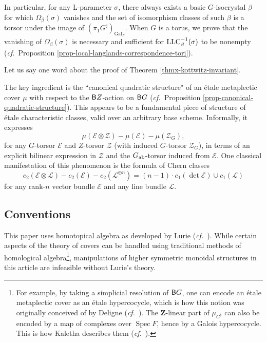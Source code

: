 \documentclass[10pt,english,reqno]{amsart}
\newcommand{\integers}{\mathbf Z}
\newcommand{\Gal}{\operatorname{Gal}}
\newcommand{\deloop}{\textnormal{\textsf{B}}}
\newcommand{\Spec}{\operatorname{Spec}}
\newcommand{\abelian}{\textnormal{ab}}
\newcommand{\LLC}{\textnormal{LLC}}
\theoremstyle{definition}
\numberwithin{equation}{section}
\begin{document}

In particular, for any L-parameter $\sigma$, there always exists a basic $G$-isocrystal $\beta$ for which $\Omega_{\beta}(\sigma)$ vanishes and the set of isomorphism classes of such $\beta$ is a torsor under the image of $(\pi_1G^{\sharp})_{\Gal_F}$. When $G$ is a torus, we prove that the vanishing of $\Omega_{\beta}(\sigma)$ is necessary and sufficient for $\LLC_{\beta}^{-1}(\sigma)$ to be nonempty (\emph{cf.}~Proposition \ref{prop-local-langlands-correspondence-tori}).

Let us say one word about the proof of Theorem \ref{thmx-kottwitz-invariant}.

The key ingredient is the ``canonical quadratic structure" of an \'etale metaplectic cover $\mu$ with respect to the $\deloop Z$-action on $\deloop G$ (\emph{cf.}~Proposition \ref{prop-canonical-quadratic-structure}). This appears to be a fundamental piece of structure of \'etale characteristic classes, valid over an arbitrary base scheme. Informally, it expresses
$$
\mu(\mathscr E\otimes \mathscr Z) - \mu(\mathscr E) -\mu(\mathscr Z_G),
$$
for any $G$-torsor $\mathscr E$ and $Z$-torsor $\mathscr Z$ (with induced $G$-torsor $\mathscr Z_G$), in terms of an explicit bilinear expression in $\mathscr Z$ and the $G_{\abelian}$-torsor induced from $\mathscr E$. One classical manifestation of this phenomenon is the formula of Chern classes
$$
c_2(\mathscr E \otimes \mathscr L) - c_2(\mathscr E) - c_2(\mathscr L^{\oplus n}) = (n-1) \cdot c_1(\det\mathscr E) \cup c_1(\mathscr L)
$$
for any rank-$n$ vector bundle $\mathscr E$ and any line bundle $\mathscr L$.


\subsection{Conventions}

This paper uses homotopical algebra as developed by Lurie (\emph{cf.}~\cite{MR2522659, lurie2017higher}). While certain aspects of the theory of covers can be handled using traditional methods of homological algebra\footnote{For example, by taking a simplicial resolution of $\deloop G$, one can encode an \'etale metaplectic cover as an \'etale hypercocycle, which is how this notion was originally conceived of by Deligne (\emph{cf.}~\cite{MR1441006}). The $\integers$-linear part of $\mu_{G^{\sharp}}$ can also be encoded by a map of complexes over $\Spec F$, hence by a Galois hypercocycle. This is how Kaletha describes them (\emph{cf.}~\cite{kaletha2022}).}, manipulations of higher symmetric monoidal structures in this article are infeasible without Lurie's theory.
\end{document}

